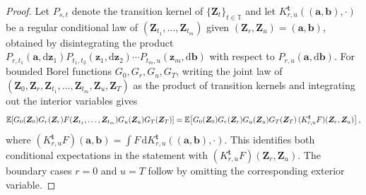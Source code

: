 \documentclass{article}
\def\E{\mathbb{E}}
\def\T{\mathbb{T}}
\def\dd{\mathrm{d}}
\theoremstyle{definition}
\begin{document}
\begin{proof}
Let $P_{s,t}$ denote the transition kernel of $\{\boldsymbol{Z}_t\}_{t\in\T}$ and let $K^{\boldsymbol{t}}_{r,u}((\boldsymbol{a},\boldsymbol{b}),\cdot)$ be a regular conditional law of $(\boldsymbol{Z}_{t_1},\ldots,\boldsymbol{Z}_{t_m})$ given $(\boldsymbol{Z}_r,\boldsymbol{Z}_u)=(\boldsymbol{a},\boldsymbol{b})$, obtained by disintegrating the product
$P_{r,t_1}(\boldsymbol{a},\dd \boldsymbol{z}_1) P_{t_1,t_2}(\boldsymbol{z}_1,\dd \boldsymbol{z}_2)\cdots P_{t_m,u}(\boldsymbol{z}_m,\dd \boldsymbol{b})$
with respect to $P_{r,u}(\boldsymbol{a},\dd \boldsymbol{b})$. For bounded Borel functions $G_0,G_r,G_u,G_T$, writing the joint law of $(\boldsymbol{Z}_0, \boldsymbol{Z}_r, \boldsymbol{Z}_{t_1}, \ldots, \boldsymbol{Z}_{t_m}, \boldsymbol{Z}_u, \boldsymbol{Z}_T)$ as the product of transition kernels and integrating out the interior variables gives
\begin{align}
\E\!\left[
G_0(\boldsymbol{Z}_0)G_r(\boldsymbol{Z}_r)
F(\boldsymbol{Z}_{t_1},\ldots,\boldsymbol{Z}_{t_m})
G_u(\boldsymbol{Z}_u)G_T(\boldsymbol{Z}_T)
\right]
=
\E\!\left[
G_0(\boldsymbol{Z}_0)G_r(\boldsymbol{Z}_r)
G_u(\boldsymbol{Z}_u)G_T(\boldsymbol{Z}_T)\,
(K^{\boldsymbol{t}}_{r,u}F)(\boldsymbol{Z}_r,\boldsymbol{Z}_u)
\right], \notag
\end{align}
where $(K^{\boldsymbol{t}}_{r,u}F)(\boldsymbol{a},\boldsymbol{b}) = \int F\,\dd K^{\boldsymbol{t}}_{r,u}((\boldsymbol{a},\boldsymbol{b}),\cdot)$. This identifies both conditional expectations in the statement with $(K^{\boldsymbol{t}}_{r,u}F)(\boldsymbol{Z}_r,\boldsymbol{Z}_u)$. The boundary cases $r=0$ and $u=T$ follow by omitting the corresponding exterior variable.
\end{proof}
\end{document}
